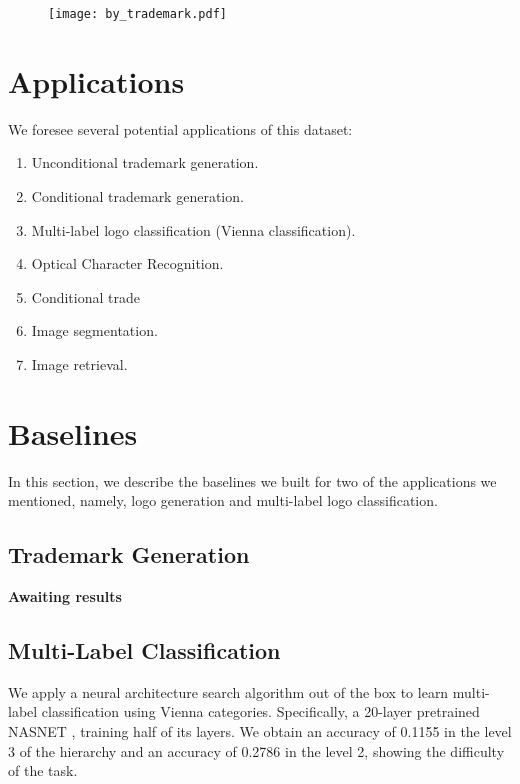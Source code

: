\documentclass{article}
\begin{document}
\begin{figure}[t]
\texttt{[image: by\_trademark.pdf]}
\label{fig:stats2}
\centering
\end{figure}




\section{Applications}

We foresee several potential applications of this dataset:
\begin{enumerate}
    \item Unconditional trademark generation.
    \item Conditional trademark generation.
    \item Multi-label logo classification (Vienna classification).
    \item Optical Character Recognition.
    \item Conditional trade
    \item Image segmentation.
    \item Image retrieval.
\end{enumerate}












\section{Baselines}

In this section, we describe the baselines we built for two of the applications we mentioned, namely, logo generation and multi-label logo classification.

\subsection{Trademark Generation}


\textbf{Awaiting results}


\subsection{Multi-Label Classification}


We apply a neural architecture search algorithm out of the box to learn multi-label classification using Vienna categories. Specifically, a 20-layer pretrained NASNET \citep{DBLP:journals/corr/ZophVSL17}, training half of its layers. We obtain an accuracy of 0.1155 in the level 3 of the hierarchy and an accuracy of 0.2786 in the level 2, showing the difficulty of the task.
\end{document}
